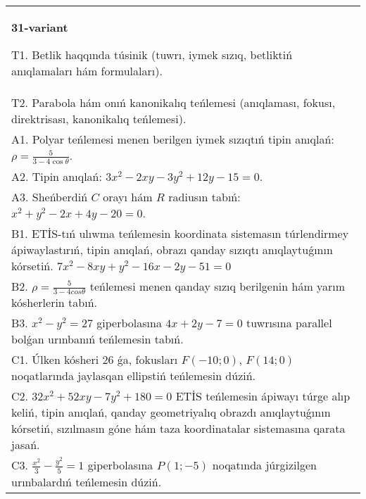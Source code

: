 \documentclass{article}
\begin{document}
\begin{tabular}{m{17cm}}
\textbf{31-variant}
\newline

T1. Betlik haqqında túsinik (tuwrı, iymek sızıq, betliktiń anıqlamaları hám formulaları).\\

T2. Parabola hám onıń kanonikalıq teńlemesi (anıqlaması, fokusı, direktrisası, kanonikalıq teńlemesi).\\

A1. Polyar teńlemesi menen berilgen iymek sızıqtıń tipin anıqlań: $\rho=\frac{5}{3-4\cos\theta}$.\\

A2. Tipin anıqlań: $3 x^{2}-2 xy-3 y^{2}+12 y-15=0$.\\

A3. Sheńberdiń $C$ orayı hám $R$ radiusın tabıń: $x^2+y^2-2 x+4 y-20=0$.\\

B1. ETİS-tıń ulıwma teńlemesin koordinata sistemasın túrlendirmey ápiwaylastırıń, tipin anıqlań, obrazı qanday sızıqtı anıqlaytuǵının kórsetiń. $7x^{2} - 8xy + y^{2} - 16x - 2y - 51 = 0$  \\

B2. $\rho = \frac{5}{3 - 4cos\theta}$ teńlemesi menen qanday sızıq berilgenin hám yarım kósherlerin tabıń.  \\

B3. $x^{2} - y^{2} = 27$ giperbolasına $4x + 2y - 7 = 0$ tuwrısına parallel bolǵan urınbanıń teńlemesin tabıń.  \\

C1. Úlken kósheri 26 ǵa, fokusları $F( - 10;0)$, $F(14;0)$ noqatlarında jaylasqan ellipstiń teńlemesin dúziń.  \\

C2. $32x^{2} + 52xy - 7y^{2} + 180 = 0$ ETİS teńlemesin ápiwayı túrge alıp keliń, tipin anıqlań, qanday geometriyalıq obrazdı anıqlaytuǵının kórsetiń, sızılmasın góne hám taza koordinatalar sistemasına qarata jasań.  \\

C3. $\frac{x^{2}}{3} - \frac{y^{2}}{5} = 1$ giperbolasına $P(1; - 5)$ noqatında júrgizilgen urınbalardıń teńlemesin dúziń.\\

\end{tabular}
\vspace{1cm}
\end{document}
